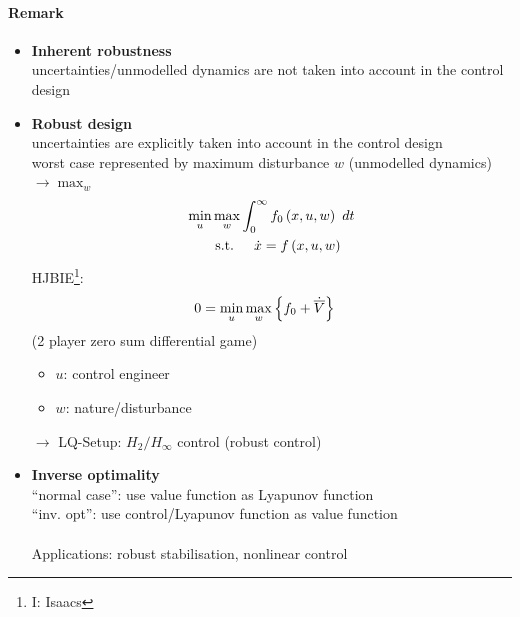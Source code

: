 \paragraph{Remark}
\begin{itemize}
    \item \textbf{Inherent robustness}\\
            uncertainties/unmodelled dynamics are not taken into account in the control design
    \item \textbf{Robust design}\\
            uncertainties are explicitly taken into account in the control design\\
            worst case represented by maximum disturbance $w$
            (unmodelled dynamics) $\rightarrow \max_w$
\begin{align*}
    \min_u \max_w &\int_{0}^{\infty} f_0 \left( x,u,w \right) ~dt\\
    \textnormal{s.t. } &\quad \dot{x} = f \left( x,u,w \right)
\end{align*}
HJBIE\footnote{I: Isaacs}:
\begin{align*}
    0 &= \min_u \max_w \set{f_0 + \Vbard{}}
\end{align*}
(2 player zero sum differential game)
    \begin{itemize}
        \item $u$: control engineer
        \item $w$: nature/disturbance
    \end{itemize}
    $\rightarrow$ LQ-Setup: $H_2/H_\infty$ control (robust control)
    \item \textbf{Inverse optimality}\\
        ``normal case'': use value function as Lyapunov function\\
        ``inv. opt'': use control/Lyapunov function as value function\\
        \\
        Applications: robust stabilisation, nonlinear control
\end{itemize}
